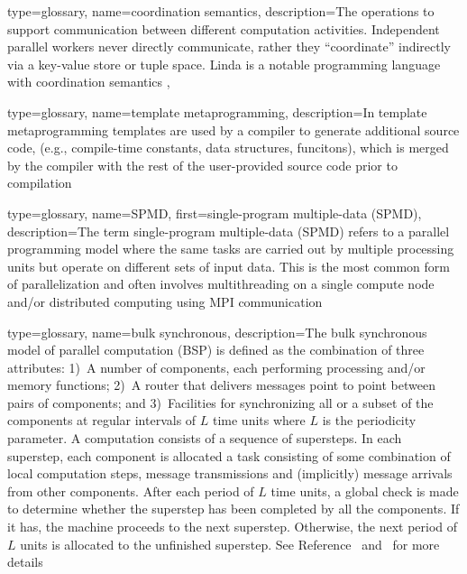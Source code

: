 {
  type=glossary,
  name={coordination semantics},
  description={The operations to support communication between different
    computation activities. Independent parallel workers never directly
      communicate, rather they ``coordinate'' indirectly via a \gls{key-value
        store} or \gls{tuple space}. \gls{Linda} is a notable \gls{programming
        language} with coordination semantics
  },
}


{
  type=glossary,
  name={template metaprogramming},
  description={In template metaprogramming templates are used by a compiler to
    generate additional source code, (e.g., compile-time constants, data
        structures, funcitons), which is merged by the compiler with the rest
      of the user-provided source code prior to compilation} 
}

{
  type=glossary,
  name={SPMD},
  first={single-program multiple-data (SPMD)},
  description={The term single-program multiple-data (SPMD) refers to a parallel \gls{programming model} where the same tasks are carried out by multiple processing units but operate on different sets of input data. This is the most common form of parallelization and often involves multithreading on a single compute node and/or distributed computing using \gls{MPI} communication}
}




{
  type=glossary,
  name={bulk synchronous},
  description={The bulk synchronous model of parallel computation (BSP) is
  defined as the combination of three attributes: 1)~A number of
  components, each performing processing and/or memory functions; 2)~A
  router that delivers messages point to point between pairs of
  components; and 3)~Facilities for synchronizing all or a subset of
  the components at regular intervals of $L$ time units where $L$ is
  the periodicity parameter.  A computation consists of a sequence of
  supersteps. In each superstep, each component is allocated a task
  consisting of some combination of local computation steps, message
  transmissions and (implicitly) message arrivals from other
  components. After each period of $L$ time units, a global check is
  made to determine whether the superstep has been completed by all
  the components. If it has, the machine proceeds to the next
  superstep. Otherwise, the next period of $L$ units is allocated to
  the unfinished superstep.  See Reference~\cite{BSP}
  and~\cite{wikiBSP} for more details} 
}

